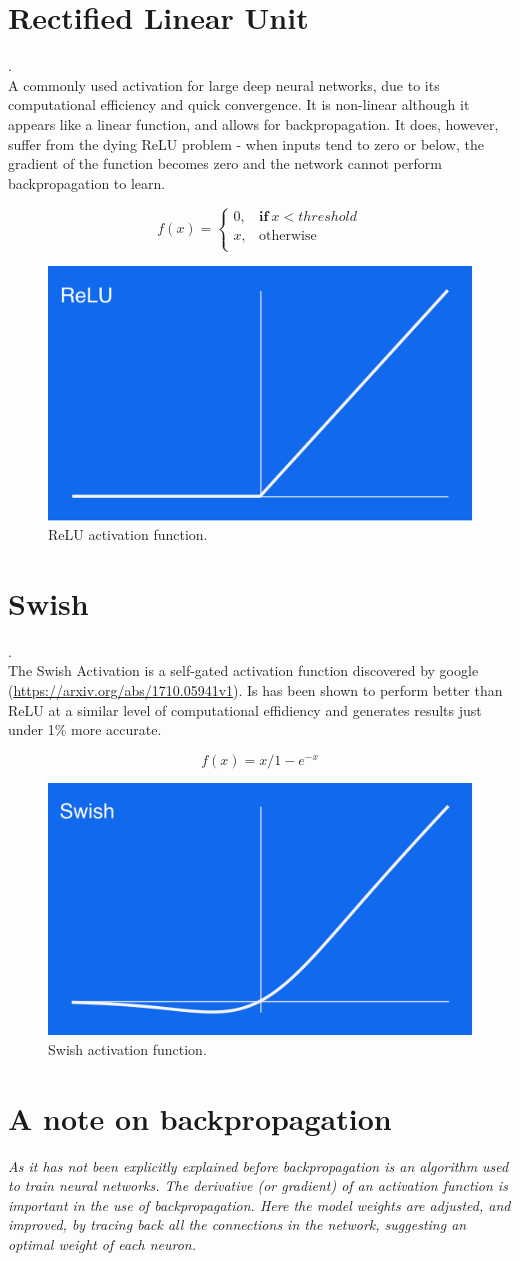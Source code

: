 \section{Rectified Linear Unit}.\\
A commonly used activation for large deep neural networks, due to its computational efficiency and quick convergence. It is non-linear although it appears like a linear function, and allows for backpropagation. It does, however, suffer from the dying ReLU problem - when inputs tend to zero or below, the gradient of the function becomes zero and the network cannot perform backpropagation to learn.

\begin{equation}
f(x) =
    \begin{cases}
      0 , & \mathbf{if} \ x < threshold \\
      x , & \text{otherwise}\\
    \end{cases}
  \end{equation}
\begin{figure}[H]
\centering
\includegraphics[width=.265\textwidth]{relu.png}
\caption{ReLU activation function.}
\end{figure}



\section{Swish}.\\
The Swish Activation is a self-gated activation function discovered by google (\url{https://arxiv.org/abs/1710.05941v1}). Is has been shown to perform better than ReLU at a similar level of computational effidiency and generates results just under 1\% more accurate. 

\begin{equation}
f(x) = x/1-e^{-x}
  \end{equation}
\begin{figure}[H]
\centering
\includegraphics[width=.265\textwidth]{swish.png}
\caption{Swish activation function.}
\end{figure}

\section{\textbf{A note on backpropagation}}
\emph{As it has not been explicitly explained before backpropagation is an algorithm used to train neural networks. The derivative (or gradient) of an activation function is important in the use of backpropagation. Here the model weights are adjusted, and improved, by tracing back all the connections in the network, suggesting an optimal weight of each neuron.}
